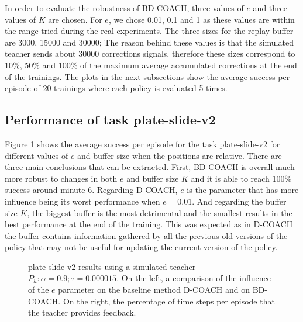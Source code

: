 In order to evaluate the robustness of BD-COACH, three values of $e$ and three values of $K$ are chosen. For $e$, we chose 0.01, 0.1 and 1 as these values are within the range tried during the real experiments. The three sizes for the replay buffer are 3000, 15000 and 30000; The reason behind these values is that the simulated teacher sends about 30000 corrections signals, therefore these sizes correspond to 10\%, 50\%  and 100\% of the maximum average accumulated corrections at the end of the trainings. The plots in the next subsections show the average success per episode of 20 trainings where each policy is evaluated 5 times.

\subsection{Performance of task plate-slide-v2}
\label{subsection:Performance of task plate_slide_v2}




Figure \ref{fig:results_plate_slide_buffer_e} shows the average success per episode for the task plate-slide-v2 for different values of $e$ and buffer size when the positions are relative. There are three main conclusions that can be extracted. First, BD-COACH is overall much more robust to changes in both $e$ and buffer size $K$ and it is able to reach 100\% success around minute 6. Regarding D-COACH, $e$ is the parameter that has more influence being its worst performance when $e=0.01$. And regarding the buffer size $K$, the biggest buffer is the most detrimental and the smallest results in the best performance at the end of the training.
This was expected as in D-COACH the buffer contains information gathered by all the previous old versions of the policy that may not be useful for updating the current version of the policy.

 \begin{figure}[H]
  \centering
   \hfill
  \caption{plate-slide-v2 results using a simulated teacher $P_h: \alpha = 0.9; \tau =  0.000015$. On the left, a comparison of the influence of the $e$ parameter on the baseline method D-COACH and on BD-COACH. On the right, the percentage of time steps per episode that the teacher  provides feedback.}
  \label{fig:results_plate_slide_buffer_e}
\end{figure}

